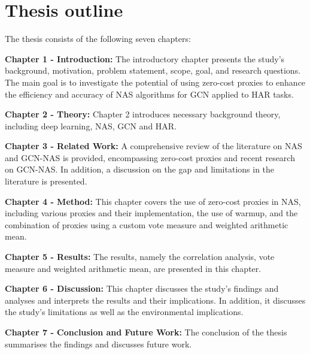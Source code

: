 \section{Thesis outline}

The thesis consists of the following seven chapters:

\textbf{Chapter 1 - Introduction:} The introductory chapter presents the study's background, motivation, problem statement, scope, goal, and research questions. The main goal is to investigate the potential of using zero-cost proxies to enhance the efficiency and accuracy of \gls{NAS} algorithms for \gls{GCN} applied to \gls{HAR} tasks. 

\textbf{Chapter 2 - Theory:} Chapter 2 introduces necessary background theory, including deep learning, \gls{NAS}, \gls{GCN} and \gls{HAR}.  

\textbf{Chapter 3 - Related Work:} A comprehensive review of the literature on \gls{NAS} and \gls{GCN}-\gls{NAS} is provided, encompassing zero-cost proxies and recent research on \gls{GCN}-\gls{NAS}. In addition, a discussion on the gap and limitations in the literature is presented. 

\textbf{Chapter 4 - Method:} This chapter covers the use of zero-cost proxies in \gls{NAS}, including various proxies and their implementation, the use of warmup, and the combination of proxies using a custom vote measure and weighted arithmetic mean. 

\textbf{Chapter 5 - Results:} The results, namely the correlation analysis, vote measure and weighted arithmetic mean, are presented in this chapter. 

\textbf{Chapter 6 - Discussion:} This chapter discusses the study's findings and analyses and interprets the results and their implications. In addition, it discusses the study's limitations as well as the environmental implications.

\textbf{Chapter 7 - Conclusion and Future Work:} The conclusion of the thesis summarises the findings and discusses future work. 